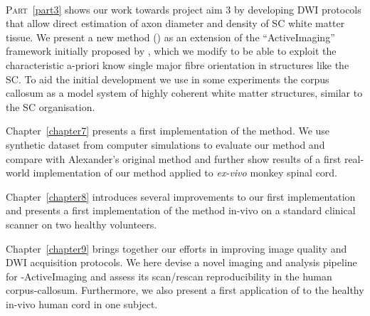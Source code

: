 \paragraph{}{\scshape{Part}}~{\protect\ref{part3}} shows our work towards project aim 3 by developing \gls{DWI} protocols that allow direct estimation of axon diameter and density of SC white matter tissue. We present a new method ({\SF}) as an extension of the ``ActiveImaging'' framework initially proposed by \citet{Alexander:2008}, which we modify to be able to exploit the characteristic a-priori know single major fibre orientation in structures like the \gls{SC}. To aid the initial development we use in some experiments the corpus callosum as a model system of highly coherent white matter structures, similar to the \gls{SC} organisation.

Chapter~\ref{chapter7} presents a first implementation of the {\SF} method. We use synthetic dataset from computer simulations to evaluate our method and compare with Alexander's original method and further show results of a first real-world implementation of our method applied to \emph{ex-vivo} monkey spinal cord.

Chapter~\ref{chapter8} introduces several improvements to our first {\SF} implementation and presents a first implementation of the {\SF} method in-vivo on a standard clinical scanner on two healthy volunteers. 

Chapter~\ref{chapter9} brings together our efforts in improving image quality and \gls{DWI} acquisition protocols. We here devise a novel imaging and analysis pipeline for  {\SF}-ActiveImaging and assess its scan/rescan reproducibility in the human corpus-callosum. Furthermore, we also present a first application of {\SF} to the healthy in-vivo human cord in one subject.

